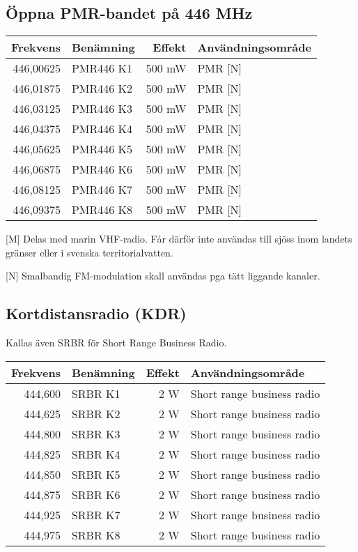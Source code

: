 \documentclass[10pt,swedish,a4paper]{article}
\begin{document}
\subsection{Öppna PMR-bandet på 446 MHz}
\begin{tabular}{rlrl}
	\textbf{Frekvens} & \textbf{Benämning} & \textbf{Effekt} & \textbf{Användningsområde} \\ \hline
	        446,00625 & PMR446 K1          &          500 mW & PMR [N]                    \\
	        446,01875 & PMR446 K2          &          500 mW & PMR [N]                    \\
	        446,03125 & PMR446 K3          &          500 mW & PMR [N]                    \\
	        446,04375 & PMR446 K4          &          500 mW & PMR [N]                    \\
	        446,05625 & PMR446 K5          &          500 mW & PMR [N]                    \\
	        446,06875 & PMR446 K6          &          500 mW & PMR [N]                    \\
	        446,08125 & PMR446 K7          &          500 mW & PMR [N]                    \\
	        446,09375 & PMR446 K8          &          500 mW & PMR [N]
\end{tabular}

[M] Delas med marin VHF-radio. Får därför inte användas till sjöss inom landets gränser eller i svenska territorialvatten.

[N] Smalbandig FM-modulation skall användas pga tätt liggande kanaler.

\subsection{Kortdistansradio (KDR)}

Kallas även SRBR för Short Range Business Radio.

\begin{tabular}{rlrl}
	\textbf{Frekvens} & \textbf{Benämning} & \textbf{Effekt} & \textbf{Användningsområde} \\ \hline
	          444,600 & SRBR K1            &             2 W & Short range business radio \\
	          444,625 & SRBR K2            &             2 W & Short range business radio \\
	          444,800 & SRBR K3            &             2 W & Short range business radio \\
	          444,825 & SRBR K4            &             2 W & Short range business radio \\
	          444,850 & SRBR K5            &             2 W & Short range business radio \\
	          444,875 & SRBR K6            &             2 W & Short range business radio \\
	          444,925 & SRBR K7            &             2 W & Short range business radio \\
	          444,975 & SRBR K8            &             2 W & Short range business radio
\end{tabular}
\end{document}

